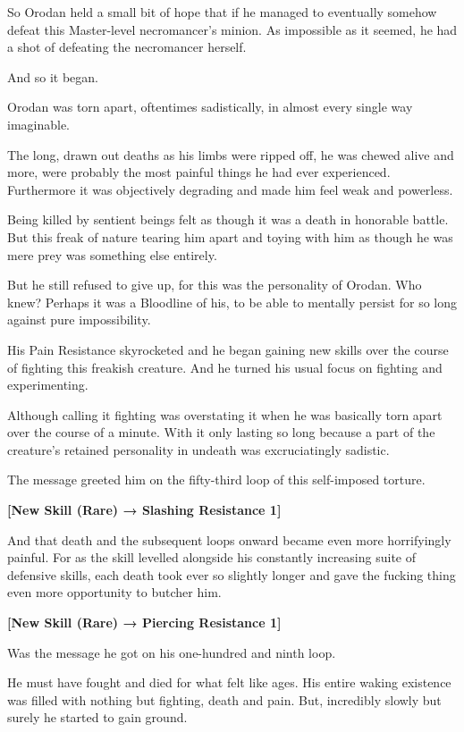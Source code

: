 \documentclass[a4paper,10pt]{book}
\begin{document}
So Orodan held a small bit of hope that if he managed to eventually somehow defeat this Master-level necromancer’s minion. As impossible as it seemed, he had a shot of defeating the necromancer herself.\par
And so it began.\par
Orodan was torn apart, oftentimes sadistically, in almost every single way imaginable.\par
The long, drawn out deaths as his limbs were ripped off, he was chewed alive and more, were probably the most painful things he had ever experienced. Furthermore it was objectively degrading and made him feel weak and powerless.\par
Being killed by sentient beings felt as though it was a death in honorable battle. But this freak of nature tearing him apart and toying with him as though he was mere prey was something else entirely.\par
But he still refused to give up, for this was the personality of Orodan. Who knew? Perhaps it was a Bloodline of his, to be able to mentally persist for so long against pure impossibility.\par
His Pain Resistance skyrocketed and he began gaining new skills over the course of fighting this freakish creature. And he turned his usual focus on fighting and experimenting.\par
Although calling it fighting was overstating it when he was basically torn apart over the course of a minute. With it only lasting so long because a part of the creature’s retained personality in undeath was excruciatingly sadistic.\par
The message greeted him on the fifty-third loop of this self-imposed torture.\par
\textbf{[New Skill (Rare) → Slashing Resistance 1]}\par
And that death and the subsequent loops onward became even more horrifyingly painful. For as the skill levelled alongside his constantly increasing suite of defensive skills, each death took ever so slightly longer and gave the fucking thing even more opportunity to butcher him.\par
\textbf{[New Skill (Rare) → Piercing Resistance 1]}\par
Was the message he got on his one-hundred and ninth loop.\par
He must have fought and died for what felt like ages. His entire waking existence was filled with nothing but fighting, death and pain. But, incredibly slowly but surely he started to gain ground.\par
\end{document}
